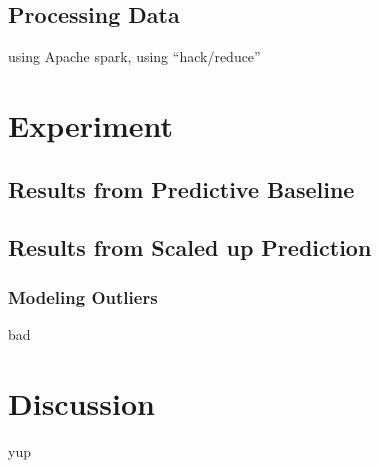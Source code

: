 \documentclass{article}
\begin{document}
\subsection{Processing Data}

using Apache spark, using ``hack/reduce''

\section{Experiment}

\subsection{Results from Predictive Baseline}

\subsection{Results from Scaled up Prediction}

\subsubsection{Modeling Outliers}

bad 

 \section{Discussion}

 yup



\end{document}
